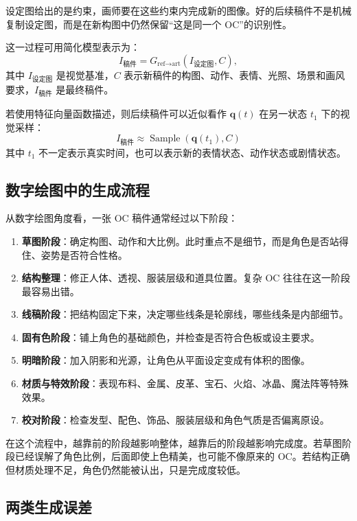 设定图给出的是约束，画师要在这些约束内完成新的图像。好的后续稿件不是机械复制设定图，而是在新构图中仍然保留“这是同一个 OC”的识别性。

这一过程可用简化模型表示为：
\begin{equation}
    I_{\text{稿件}}=G_{\text{ref}\to\text{art}}(I_{\text{设定图}},C),
\end{equation}
其中 $I_{\text{设定图}}$ 是视觉基准，$C$ 表示新稿件的构图、动作、表情、光照、场景和画风要求，$I_{\text{稿件}}$ 是最终稿件。

若使用特征向量函数描述，则后续稿件可以近似看作 $\mathbf{q}(t)$ 在另一状态 $t_1$ 下的视觉采样：
\begin{equation}
    I_{\text{稿件}}\approx \operatorname{Sample}(\mathbf{q}(t_1),C)
\end{equation}
其中 $t_1$ 不一定表示真实时间，也可以表示新的表情状态、动作状态或剧情状态。

\subsection{数字绘图中的生成流程}

从数字绘图角度看，一张 OC 稿件通常经过以下阶段：
\begin{enumerate}
    \item \textbf{草图阶段}：确定构图、动作和大比例。此时重点不是细节，而是角色是否站得住、姿势是否符合性格。
    \item \textbf{结构整理}：修正人体、透视、服装层级和道具位置。复杂 OC 往往在这一阶段最容易出错。
    \item \textbf{线稿阶段}：把结构固定下来，决定哪些线条是轮廓线，哪些线条是内部细节。
    \item \textbf{固有色阶段}：铺上角色的基础颜色，并检查是否符合色板或设主要求。
    \item \textbf{明暗阶段}：加入阴影和光源，让角色从平面设定变成有体积的图像。
    \item \textbf{材质与特效阶段}：表现布料、金属、皮革、宝石、火焰、冰晶、魔法阵等特殊效果。
    \item \textbf{校对阶段}：检查发型、配色、饰品、服装层级和角色气质是否偏离原设。
\end{enumerate}

在这个流程中，越靠前的阶段越影响整体，越靠后的阶段越影响完成度。若草图阶段已经误解了角色比例，后面即使上色精美，也可能不像原来的 OC。若结构正确但材质处理不足，角色仍然能被认出，只是完成度较低。

\subsection{两类生成误差}

